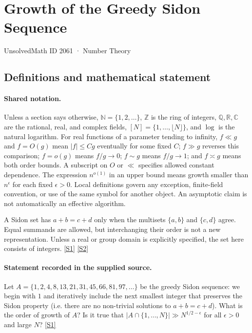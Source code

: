 \documentclass[11pt,a4paper]{article}
\newcommand{\N}{\mathbb{N}}
\newcommand{\Z}{\mathbb{Z}}
\newcommand{\Q}{\mathbb{Q}}
\newcommand{\R}{\mathbb{R}}
\newcommand{\C}{\mathbb{C}}
\newcommand{\sref}[2]{\hyperlink{source:#1:#2}{[S#2]}}
\begin{document}

\setcounter{section}{2060}

\section{Growth of the Greedy Sidon Sequence}\label{2061}

{\small\sffamily UnsolvedMath ID 2061 · Number Theory}

\subsection{Definitions and mathematical statement}

\paragraph{Shared notation.}Unless a section says otherwise, $\N=\{1,2,\ldots\}$,
$\Z$ is the ring of integers, $\Q,\R,\C$ are the rational, real, and complex
fields, $[N]=\{1,\ldots,\lfloor N\rfloor\}$, and $\log$ is the natural
logarithm. For real functions of a parameter tending to infinity,
$f\ll g$ and $f=O(g)$ mean $|f|\leq Cg$ eventually for some fixed $C$;
$f\gg g$ reverses this comparison; $f=o(g)$ means $f/g\to0$;
$f\sim g$ means $f/g\to1$; and $f\asymp g$ means both order bounds.
A subscript on $O$ or $\ll$ specifies allowed constant dependence.
The expression $n^{o(1)}$ in an upper bound means growth smaller than
$n^\epsilon$ for each fixed $\epsilon>0$. Local definitions govern any
exception, finite-field convention, or use of the same symbol for another
object. An asymptotic claim is not automatically an effective algorithm.



A Sidon set has $a+b=c+d$ only when the multisets $\{a,b\}$ and $\{c,d\}$ agree. Equal summands are allowed, but interchanging their order is not a new representation. Unless a real or group domain is explicitly specified, the set here consists of integers. \sref{2061}{1} \sref{2061}{2}

\paragraph{Statement recorded in the supplied source.}
Let $A=\{1,2,4,8,13,21,31,45,66,81,97,\ldots\}$ be the greedy Sidon sequence: we begin with $1$ and iteratively include the next smallest integer that preserves the Sidon property (i.e. there are no non-trivial solutions to $a+b=c+d$). What is the order of growth of $A$? Is it true that $ \lvert A\cap \{1,\ldots,N\}\rvert \gg N^{1/2-\epsilon} $ for all $\epsilon>0$ and large $N$? \sref{2061}{1}
\end{document}
